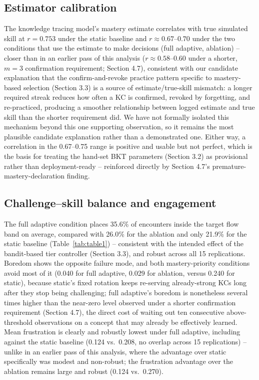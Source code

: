 \documentclass[11pt]{article}
\begin{document}
\subsection{Estimator calibration}

The knowledge tracing model's mastery estimate correlates with true simulated skill at $r{=}0.753$ under the static baseline and $r \approx 0.67$--$0.70$ under the two conditions that use the estimate to make decisions (full adaptive, ablation) -- closer than in an earlier pass of this analysis ($r \approx 0.58$--$0.60$ under a shorter, $m{=}3$ confirmation requirement; Section 4.7), consistent with our candidate explanation that the confirm-and-revoke practice pattern specific to mastery-based selection (Section 3.3) is a source of estimate/true-skill mismatch: a longer required streak reduces how often a KC is confirmed, revoked by forgetting, and re-practiced, producing a smoother relationship between logged estimate and true skill than the shorter requirement did. We have not formally isolated this mechanism beyond this one supporting observation, so it remains the most plausible candidate explanation rather than a demonstrated one. Either way, a correlation in the 0.67--0.75 range is positive and usable but not perfect, which is the basis for treating the hand-set BKT parameters (Section 3.2) as provisional rather than deployment-ready -- reinforced directly by Section 4.7's premature-mastery-declaration finding.

\subsection{Challenge--skill balance and engagement}

The full adaptive condition places 35.6\% of encounters inside the target flow band on average, compared with 26.0\% for the ablation and only 21.9\% for the static baseline (Table~\ref{tab:table1}) -- consistent with the intended effect of the bandit-based tier controller (Section 3.3), and robust across all 15 replications. Boredom shows the opposite failure mode, and both mastery-priority conditions avoid most of it (0.040 for full adaptive, 0.029 for ablation, versus 0.240 for static), because static's fixed rotation keeps re-serving already-strong KCs long after they stop being challenging; full adaptive's boredom is nonetheless several times higher than the near-zero level observed under a shorter confirmation requirement (Section 4.7), the direct cost of waiting out ten consecutive above-threshold observations on a concept that may already be effectively learned. Mean frustration is clearly and robustly lowest under full adaptive, including against the static baseline (0.124 vs.\ 0.208, no overlap across 15 replications) -- unlike in an earlier pass of this analysis, where the advantage over static specifically was modest and non-robust; the frustration advantage over the ablation remains large and robust (0.124 vs.\ 0.270).
\end{document}
